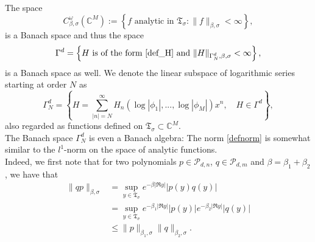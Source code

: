 \documentclass{amsart}
\theoremstyle{plain}
\theoremstyle{definition}
\begin{document}
The space 
\begin{equation}
 C^\omega_{\beta,\sigma}(\mathbb C^M)
    :=
    \left\{
    f\text{ analytic in }  \mathfrak{T}_\sigma:
   \|f\|_{\beta,\sigma}<\infty
    \right\},
\end{equation}
is a Banach space and thus the space 
\begin{equation}\label{defGamma}
    \Gamma^d = \left\{ H \text{ is of the form \eqref{def_H} and }  \|H\|_{\Gamma_N^d,\beta,\sigma} <\infty \right\},
\end{equation}
is a Banach space as well. We denote the linear subspace of logarithmic series starting at order $N$ as 
\begin{equation}
    \Gamma^d_N = \left\{H = \sum_{|n|= N }^\infty H_n(\log|\phi_1|,...,\log|\phi_M|)x^n,\quad H \in \Gamma^d \right\},
\end{equation}
also regarded as functions defined on $\mathfrak{T}_\sigma\subset \mathbb{C}^M$.\\
The Banach space $\Gamma^d_N$ is even a Banach algebra: The norm \eqref{defnorm} is somewhat similar to the $l^1$-norm on the space of analytic functions.\\
Indeed, we first note that for two polynomials $p\in\mathcal{P}_{d,n}$, $q\in\mathcal{P}_{d,m}$ and $\beta = \beta_1+\beta_2$, we have that
\begin{equation}
\begin{split}
       \|qp\|_{\beta,\sigma} & = \sup_{y\in\mathfrak{T}_\sigma} e^{-\beta |\Re y|} |p(y)q(y)|\\
       & = \sup_{y\in\mathfrak{T}_\sigma} e^{-\beta_1 |\Re y|} |p(y)| e^{-\beta_2 |\Re y|}|q(y)|\\
    & \leq \|p\|_{\beta_1,\sigma}\|q\|_{\beta_2,\sigma}.
\end{split}
\end{equation}



\end{document}
